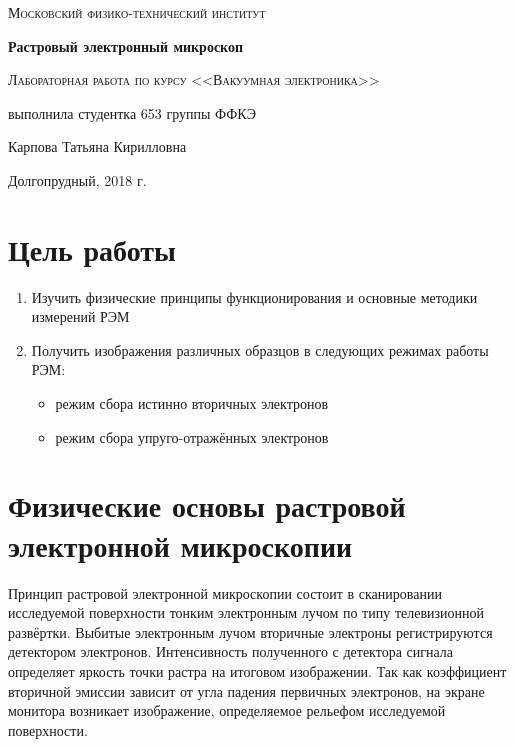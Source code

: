\documentclass[a4paper]{article}
\begin{document}
\begin{titlepage}
	\centering
	\vspace{5cm}
	{\scshape\LARGE Московский физико-технический институт \par}
	\vspace{5cm}

	{\huge\bfseries Растровый электронный микроскоп \par}

	\vspace{1cm}
	{\scshape\Large Лабораторная работа по курсу <<Вакуумная электроника>>\par}
	\vspace{1cm}
	\vfill
\begin{flushright}
	{\large выполнила студентка 653 группы ФФКЭ}\par
	\vspace{0.3cm}
	{\LARGE Карпова Татьяна Кирилловна} \par

	
\end{flushright}
	

	\vfill

	Долгопрудный, 2018 г.
\end{titlepage}


\section{Цель работы}
\begin{enumerate}
    \item Изучить физические принципы функционирования и основные методики измерений РЭМ
    \item Получить изображения различных образцов в следующих режимах работы РЭМ:
    \begin{itemize}
        \item режим сбора истинно вторичных электронов
        \item режим сбора упруго-отражённых электронов
    \end{itemize}
\end{enumerate}

\section{Физические основы растровой электронной микроскопии}
Принцип растровой электронной микроскопии состоит в сканировании исследуемой поверхности тонким электронным лучом по типу телевизионной развёртки. Выбитые электронным лучом вторичные электроны регистрируются детектором электронов. Интенсивность полученного с детектора сигнала определяет яркость точки растра на итоговом изображении. Так как коэффициент вторичной эмиссии зависит от угла падения первичных электронов, на экране монитора возникает изображение, определяемое рельефом исследуемой поверхности.
\end{document}
